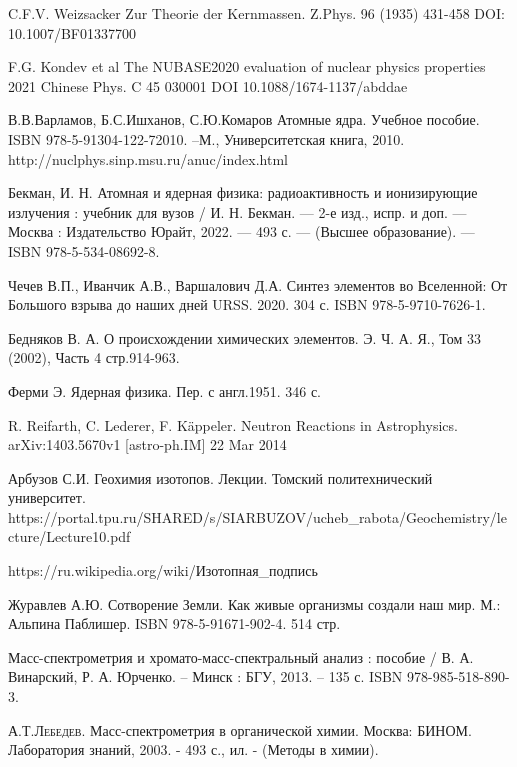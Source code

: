 \documentclass[a5paper,openany]{book}
\begin{document}
\begin{thebibliography}{00}
C.F.V. Weizsacker
Zur Theorie der Kernmassen. Z.Phys. 96 (1935) 431-458 DOI: 10.1007/BF01337700

F.G. Kondev et al The NUBASE2020 evaluation of nuclear physics properties 
2021 Chinese Phys. C 45 030001
DOI 10.1088/1674-1137/abddae

В.В.Варламов, Б.С.Ишханов, С.Ю.Комаров Атомные ядра. Учебное пособие. ISBN 978-5-91304-122-72010. –М., Университетская книга, 2010.
http://nuclphys.sinp.msu.ru/anuc/index.html

Бекман, И. Н.  Атомная и ядерная физика: радиоактивность и ионизирующие излучения : учебник для вузов / И. Н. Бекман. — 2-е изд., испр. и доп. — Москва : Издательство Юрайт, 2022. — 493 с. — (Высшее образование). — ISBN 978-5-534-08692-8. 

Чечев В.П., Иванчик А.В., Варшалович Д.А.
Синтез элементов во Вселенной: От Большого взрыва до наших дней
URSS. 2020. 304 с. ISBN 978-5-9710-7626-1.

Бедняков В. А. О происхождении химических элементов. Э. Ч. А. Я., Том 33 (2002), Часть 4 стр.914-963.

Ферми Э. Ядерная физика. Пер. с англ.1951. 346 с.

R. Reifarth, C. Lederer, F. K\"{a}ppeler.
Neutron Reactions in Astrophysics.
arXiv:1403.5670v1 [astro-ph.IM] 22 Mar 2014

Арбузов С.И. Геохимия изотопов. Лекции. Томский политехнический университет.
https://portal.tpu.ru/SHARED/s/SIARBUZOV/ucheb\_rabota/Geochemistry/lecture/Lecture10.pdf

https://ru.wikipedia.org/wiki/Изотопная\_подпись

 Журавлев А.Ю. Сотворение Земли. Как живые организмы создали наш мир.
М.: Альпина Паблишер. ISBN 978-5-91671-902-4. 514 стр.

Масс-спектрометрия и хромато-масс-спектральный анализ : пособие / В. А. Винарский, Р. А. Юрченко. – Минск : БГУ, 2013. – 135 с.
ISBN 978-985-518-890-3.


\textsc{А.Т.Лебедев.} Масс-спектрометрия в органической химии. Москва: БИНОМ. Лаборатория знаний, 2003. - 493 с., ил. - (Методы в химии).



\end{thebibliography}
\end{document}
